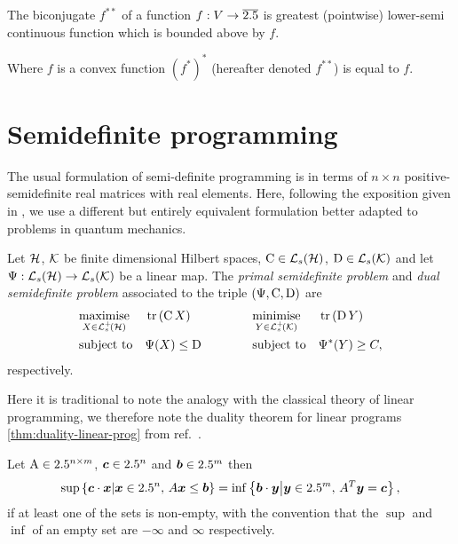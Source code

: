 \begin{thm}
  The biconjugate $f^{**}$ of a function $f:V\to\overline{2.5}$ is greatest (pointwise) lower-semi continuous function which is bounded above by $f$.
\end{thm}

Where $f$ is a convex function $(f^*)^*$ (hereafter denoted $f^{**}$) is equal to $f$.

\section{Semidefinite programming}

The usual formulation  of semi-definite programming is in terms of $n\times n$ positive-semidefinite real matrices with real elements. Here, following the exposition given in \cite{w-semidefinite-prog-cb-norms}, we use a different but entirely equivalent formulation better adapted to problems in quantum mechanics. 

\begin{defn}\label{defn:complex-semidefinite-program}
  Let $\mathcal{H}$, $\mathcal{K}$ be finite dimensional Hilbert spaces, $\opc\in\saops[\hcal]$, $\opd\in\saops[\kcal]$ and let $\Psi:\saops[\hcal]\to\saops[\kcal]$ be a linear map. The \emph{primal semidefinite problem} and \emph{dual semidefinite problem}  associated to the triple $\left(\Psi, \operatorname{C}, \operatorname{D}\right)$ are
  \begin{equation}
  \begin{aligned}
    & \underset{X\in\posops[\hcal]}{\text{maximise}} & &\tr{\opc X } \qquad\qquad & & \underset{Y\in\posops[\kcal]}{\text{minimise}} & & \tr{\opd Y} \\
    & \text{subject to} & &\Psi(X) \leq \opd & & \text{subject to} & &  \Psi^*(Y) \geq C,
  \end{aligned}
  \label{eqn:semidefinite-program}
\end{equation}
respectively.
\end{defn}

Here it is traditional to note the analogy with the classical theory of linear programming,  we therefore note the duality theorem for linear programs \eqref{thm:duality-linear-prog} from ref.~\cite{schrijver-lin-int-prog}.
\begin{thm}\label{thm:duality-linear-prog}
  Let $\operatorname{A}\in2.5^{n\times m}$, $\bm{c}\in2.5^n$ and $\bm{b}\in2.5^m$ then
  \begin{align}
    \sup\left\{\bm{c}\cdot \bm{x} \middle| \bm{x}\in2.5^n,\, A \bm{x} \leq \bm{b}\right \} = \inf\left\{ \bm{b}\cdot\bm{y} \middle|\bm{y}\in2.5^m,\, A^T \bm{y}= \bm{c}\right \},
  \end{align}
  if at least one of the sets is non-empty, with the convention that the $\sup$ and $\inf$ of an empty set are $-\infty$ and $\infty$ respectively.
\end{thm}
  
